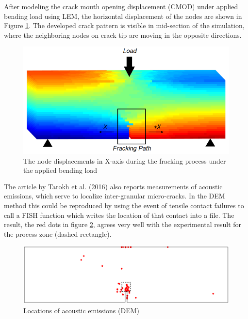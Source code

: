 After modeling the crack mouth opening displacement (CMOD) under applied bending load using LEM, the horizontal displacement of the nodes are shown in Figure \ref{fig:Amir_ME1_LEM_Displacement_Crystalline}. The developed crack pattern is visible in mid-section of the simulation, where the neighboring nodes on crack tip are moving in the opposite directions. 

\begin{figure}[!ht]
\centering
\includegraphics[width=1\textwidth]{figures/Amir_ME1_LEM_Displacement_Crystalline.png}
\caption{The node displacements in X-axis during the fracking process under the applied bending load}
\label{fig:Amir_ME1_LEM_Displacement_Crystalline}
\end{figure}

The article by Tarokh et al. (2016) \cite{Tarokh2016161} also reports measurements of acoustic emissions, which serve to localize inter-granular micro-cracks. In the DEM method this could be 
reproduced by using the event of tensile contact failures to call a FISH function which writes the location of that contact into a file. The result, the red dots in figure \ref{fig:ME1-dem-ae}, agrees very well with the experimental result for the process zone (dashed rectangle).

\begin{figure}[!ht]
\centering
\includegraphics[width=1\textwidth]{figures/sample1-ae-tillmax-v2}
\caption{Locations of acoustic emissions (DEM)}
\label{fig:ME1-dem-ae}
\end{figure}

